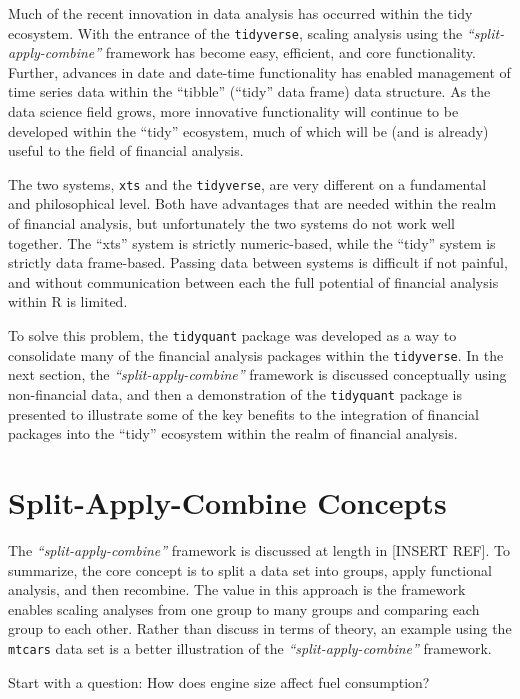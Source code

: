 Much of the recent innovation in data analysis has occurred within the
tidy ecosystem. With the entrance of the \texttt{tidyverse}, scaling
analysis using the \emph{``split-apply-combine''} framework has become
easy, efficient, and core functionality. Further, advances in date and
date-time functionality has enabled management of time series data
within the ``tibble'' (``tidy'' data frame) data structure. As the data
science field grows, more innovative functionality will continue to be
developed within the ``tidy'' ecosystem, much of which will be (and is
already) useful to the field of financial analysis.

The two systems, \texttt{xts} and the \texttt{tidyverse}, are very
different on a fundamental and philosophical level. Both have advantages
that are needed within the realm of financial analysis, but
unfortunately the two systems do not work well together. The ``xts''
system is strictly numeric-based, while the ``tidy'' system is strictly
data frame-based. Passing data between systems is difficult if not
painful, and without communication between each the full potential of
financial analysis within R is limited.

To solve this problem, the \texttt{tidyquant} package was developed as a
way to consolidate many of the financial analysis packages within the
\texttt{tidyverse}. In the next section, the
\emph{``split-apply-combine''} framework is discussed conceptually using
non-financial data, and then a demonstration of the \texttt{tidyquant}
package is presented to illustrate some of the key benefits to the
integration of financial packages into the ``tidy'' ecosystem within the
realm of financial analysis.

\section{Split-Apply-Combine
Concepts}\label{split-apply-combine-concepts}

The \emph{``split-apply-combine''} framework is discussed at length in
{[}INSERT REF{]}. To summarize, the core concept is to split a data set
into groups, apply functional analysis, and then recombine. The value in
this approach is the framework enables scaling analyses from one group
to many groups and comparing each group to each other. Rather than
discuss in terms of theory, an example using the \texttt{mtcars} data
set is a better illustration of the \emph{``split-apply-combine''}
framework.

Start with a question: How does engine size affect fuel consumption?


